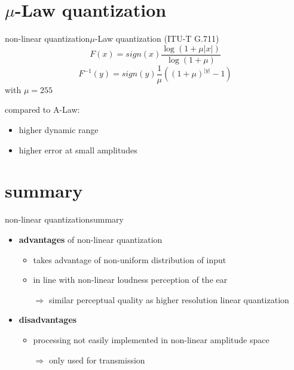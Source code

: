 \section[$\mu$-law]{$\mu$-Law quantization}
	\begin{frame}{non-linear quantization}{$\mu$-Law quantization  (ITU-T G.711)}
		\begin{equation*}
			F(x)	= sign(x)\frac{\log(1+\mu|x|)}{\log(1+\mu)}
		\end{equation*}
        \bigskip
		\begin{equation*}
			F^{-1}(y)	= sign(y)\frac{1}{\mu}\left((1+\mu)^{|y|}-1\right)
		\end{equation*}
		\bigskip
		\bigskip
        with $\mu = 255$
        
        \pause
        compared to A-Law:
        \begin{itemize}
            \item   higher dynamic range
            \item   higher error at small amplitudes
        \end{itemize}
	\end{frame}	

	\section{summary}	
		\begin{frame}{non-linear quantization}{summary}
            \begin{itemize}
                \item \textbf{advantages} of non-linear quantization
                    \begin{itemize}
                        \item   takes advantage of non-uniform distribution of input
                        \item   in line with non-linear loudness perception of the ear
                        \item[$\Rightarrow$]    similar perceptual quality as higher resolution linear quantization
                    \end{itemize}
                \bigskip
                \item    \textbf{disadvantages}
                    \begin{itemize}
                        \item   processing not easily implemented in non-linear amplitude space
                        \item[$\Rightarrow$] only used for transmission   
                    \end{itemize}
            \end{itemize}
		\end{frame}
 



